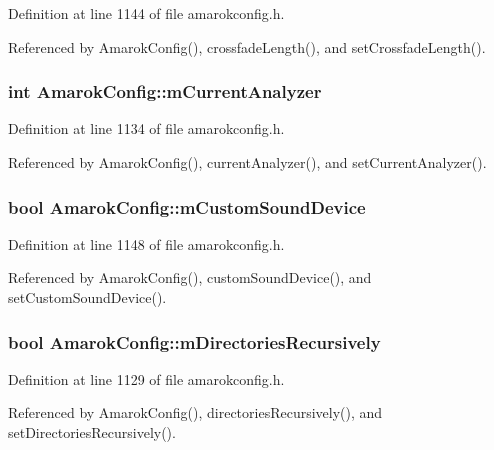 Definition at line 1144 of file amarokconfig.h.

Referenced by Amarok\-Config(), crossfade\-Length(), and set\-Crossfade\-Length().
\subsubsection{\setlength{\rightskip}{0pt plus 5cm}int {\bf Amarok\-Config::m\-Current\-Analyzer}\hspace{0.3cm}{\tt  [protected]}}\label{classAmarokConfig_AmarokConfigp20}




Definition at line 1134 of file amarokconfig.h.

Referenced by Amarok\-Config(), current\-Analyzer(), and set\-Current\-Analyzer().
\subsubsection{\setlength{\rightskip}{0pt plus 5cm}bool {\bf Amarok\-Config::m\-Custom\-Sound\-Device}\hspace{0.3cm}{\tt  [protected]}}\label{classAmarokConfig_AmarokConfigp32}




Definition at line 1148 of file amarokconfig.h.

Referenced by Amarok\-Config(), custom\-Sound\-Device(), and set\-Custom\-Sound\-Device().
\subsubsection{\setlength{\rightskip}{0pt plus 5cm}bool {\bf Amarok\-Config::m\-Directories\-Recursively}\hspace{0.3cm}{\tt  [protected]}}\label{classAmarokConfig_AmarokConfigp15}




Definition at line 1129 of file amarokconfig.h.

Referenced by Amarok\-Config(), directories\-Recursively(), and set\-Directories\-Recursively().
